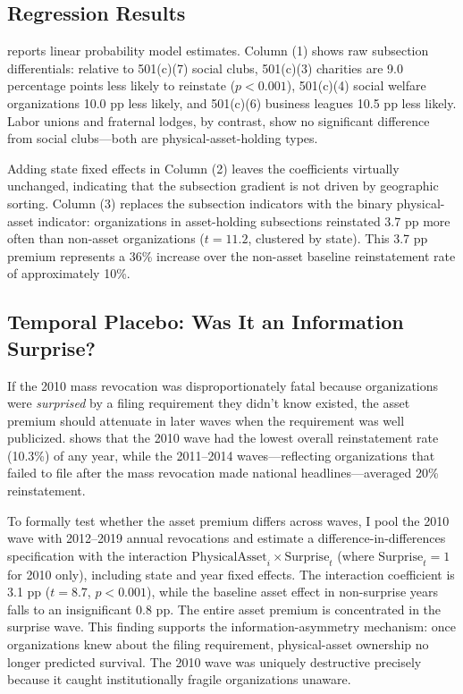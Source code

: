 \documentclass[12pt]{article}
\begin{document}


\subsection{Regression Results}

 reports linear probability model estimates. Column (1) shows raw subsection differentials: relative to 501(c)(7) social clubs, 501(c)(3) charities are 9.0 percentage points less likely to reinstate ($p < 0.001$), 501(c)(4) social welfare organizations 10.0 pp less likely, and 501(c)(6) business leagues 10.5 pp less likely. Labor unions and fraternal lodges, by contrast, show no significant difference from social clubs---both are physical-asset-holding types.

Adding state fixed effects in Column (2) leaves the coefficients virtually unchanged, indicating that the subsection gradient is not driven by geographic sorting. Column (3) replaces the subsection indicators with the binary physical-asset indicator: organizations in asset-holding subsections reinstated 3.7 pp more often than non-asset organizations ($t = 11.2$, clustered by state). This 3.7 pp premium represents a 36\% increase over the non-asset baseline reinstatement rate of approximately 10\%.



\subsection{Temporal Placebo: Was It an Information Surprise?}

If the 2010 mass revocation was disproportionately fatal because organizations were \textit{surprised} by a filing requirement they didn't know existed, the asset premium should attenuate in later waves when the requirement was well publicized.  shows that the 2010 wave had the lowest overall reinstatement rate (10.3\%) of any year, while the 2011--2014 waves---reflecting organizations that failed to file after the mass revocation made national headlines---averaged 20\% reinstatement.

To formally test whether the asset premium differs across waves, I pool the 2010 wave with 2012--2019 annual revocations and estimate a difference-in-differences specification with the interaction $\text{PhysicalAsset}_i \times \text{Surprise}_t$ (where $\text{Surprise}_t = 1$ for 2010 only), including state and year fixed effects. The interaction coefficient is 3.1 pp ($t = 8.7$, $p < 0.001$), while the baseline asset effect in non-surprise years falls to an insignificant 0.8 pp. The entire asset premium is concentrated in the surprise wave. This finding supports the information-asymmetry mechanism: once organizations knew about the filing requirement, physical-asset ownership no longer predicted survival. The 2010 wave was uniquely destructive precisely because it caught institutionally fragile organizations unaware.
\end{document}
